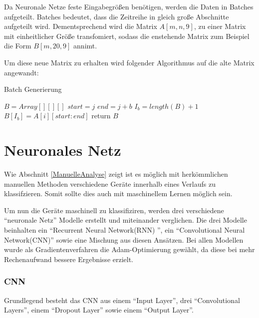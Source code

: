    Da Neuronale Netze feste Eingabegrößen benötigen, werden die Daten in Batches aufgeteilt.
    Batches bedeutet, dass die Zeitreihe in gleich große Abschnitte aufgeteilt wird.
    Dementsprechend wird die Matrix \( A[m, n, 9] \), zu einer Matrix mit einheitlicher Größe transfomiert, sodass die enstehende Matrix zum Beispiel die Form \( B[m, 20, 9] \) annimt.
    \newline

    \noindent
    Um diese neue Matrix zu erhalten wird folgender Algorithmus auf die alte Matrix angewandt:

    \begin{algorithm}
        \caption{Batch Generierung}
        \begin{algorithmic}[1]
        \State{}
            \State ${B} = Array[][][]$
                    \State $start = j$
                    \State $end = j + b$ 
                    \State $I_b = length(B) + 1$
                    \State $B[I_b] = A[i][start : end]$
                \EndFor
            \EndFor
            \State return $B$
        \EndFunction
        \end{algorithmic}
    \end{algorithm}

\section{Neuronales Netz}
    Wie Abschnitt \ref{ManuelleAnalyse} zeigt ist es möglich mit herkömmlichen manuellen Methoden verschiedene Geräte innerhalb eines Verlaufs zu klassifzieren.
    Somit sollte dies auch mit maschinellem Lernen möglich sein.
    \newline

    \noindent
    Um nun die Geräte maschinell zu klassifiziren, werden drei verschiedene "`neuronale Netz"' Modelle erstellt und miteinander verglichen.
    Die drei Modelle beinhalten ein "`Recurrent Neural Network(RNN) "', ein "`Convolutional Neural Network(CNN)"' sowie eine Mischung aus diesen Ansätzen. 
    Bei allen Modellen wurde als Gradientenverfahren die Adam-Optimierung gewählt, da diese bei mehr Rechenaufwand bessere Ergebnisse erzielt.    

    \subsubsection{CNN}
    Grundlegend besteht das \ac{CNN} aus einem "`Input Layer"', drei "`Convolutional Layers"', einem "`Dropout Layer"' sowie einem "`Output Layer"'.
    \newline

